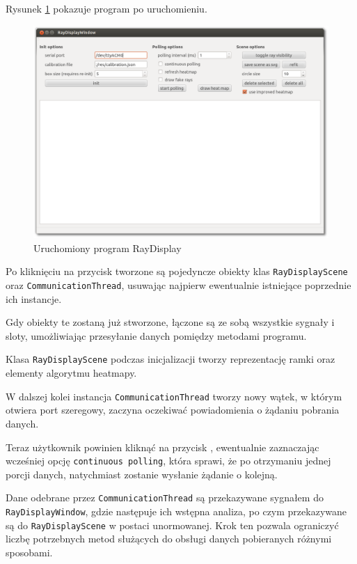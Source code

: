 Rysunek \ref{fig:raydisplay} pokazuje program po uruchomieniu.

\begin{figure}
 \centering
 \includegraphics[width=\textwidth]{gfx/RayDisplay}
 \caption{Uruchomiony program RayDisplay}
 \label{fig:raydisplay}
\end{figure}

Po kliknięciu na przycisk {} tworzone są pojedyncze obiekty klas \verb|RayDisplayScene| oraz \verb|CommunicationThread|, usuwając najpierw ewentualnie istniejące poprzednie ich instancje.

Gdy obiekty te zostaną już stworzone, łączone są ze sobą wszystkie sygnały i sloty, umożliwiając przesyłanie danych pomiędzy metodami programu.

Klasa \verb|RayDisplayScene| podczas inicjalizacji tworzy reprezentację ramki oraz elementy algorytmu heatmapy.

W dalszej kolei instancja \verb|CommunicationThread| tworzy nowy wątek, w którym otwiera port szeregowy, zaczyna oczekiwać powiadomienia o żądaniu pobrania danych.

Teraz użytkownik powinien kliknąć na przycisk , ewentualnie zaznaczając wcześniej opcję \texttt{continuous polling}, która sprawi, że po otrzymaniu jednej porcji danych, natychmiast zostanie wysłanie żądanie o kolejną.

Dane odebrane przez \verb|CommunicationThread| są przekazywane sygnałem do \verb|RayDisplayWindow|, gdzie następuje ich wstępna analiza, po czym przekazywane są do \verb|RayDisplayScene| w postaci unormowanej.
Krok ten pozwala ograniczyć liczbę potrzebnych metod służących do obsługi danych pobieranych różnymi sposobami.

